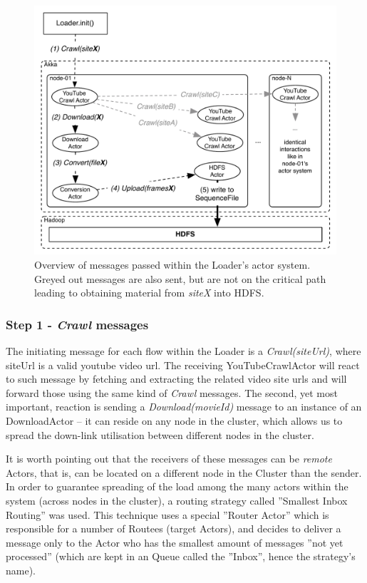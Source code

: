 \begin{figure}[ch!]
  \centering
  \includegraphics[scale=0.9]{img/loader-high-level.pdf}
  \caption{Overview of messages passed within the Loader's actor system. Greyed out messages are also sent, but are not on the critical path leading to obtaining material from \textit{siteX} into HDFS.}
  \label{fig:high-level-loader}
\end{figure}

\subsubsection{Step 1 - \textit{Crawl} messages}
The initiating message for each flow within the Loader is a \textit{Crawl(siteUrl)}, where siteUrl is a valid youtube video url.
The receiving YouTubeCrawlActor will react to such message by fetching and extracting the related video site urls and will forward those using the same kind of \textit{Crawl} messages. The second, yet most important, reaction is sending a \textit{Download(movieId)} message to an instance of an DownloadActor -- it  can reside on any node in the cluster, which allows us to spread the down-link utilisation between different nodes in the cluster.

It is worth pointing out that the receivers of these messages can be \textit{remote} Actors, that is, can be located on a different node in the Cluster than the sender. In order to guarantee spreading of the load among the many actors within the system (across nodes in the cluster), a routing strategy called ''Smallest Inbox Routing'' was used. This technique uses a special ''Router Actor'' which is responsible for a number of Routees (target Actors), and decides to deliver a message only to the Actor who has the smallest amount of messages ''not yet processed'' (which are kept in an Queue called the ''Inbox'', hence the strategy's name).

